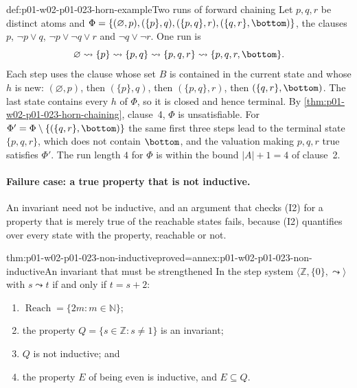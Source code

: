 \begin{hbexample}{def:p01-w02-p01-023-horn-example}{Two runs of forward chaining}
Let \(p,q,r\) be distinct atoms and
\(\Phi=\{(\varnothing,p),(\{p\},q),(\{p,q\},r),(\{q,r\},\bottom)\}\), the
clauses \(p\), \(\neg p\lor q\), \(\neg p\lor\neg q\lor r\) and
\(\neg q\lor\neg r\). One run is
\[
  \varnothing\leadsto\{p\}\leadsto\{p,q\}\leadsto\{p,q,r\}
  \leadsto\{p,q,r,\bottom\}.
\]
Each step uses the clause whose set \(B\) is contained in the current state
and whose \(h\) is new: \((\varnothing,p)\), then \((\{p\},q)\), then
\((\{p,q\},r)\), then \((\{q,r\},\bottom)\). The last state contains every
\(h\) of \(\Phi\), so it is closed and hence terminal. By
\cref{thm:p01-w02-p01-023-horn-chaining}, clause~4, \(\Phi\) is
unsatisfiable. For \(\Phi'=\Phi\setminus\{(\{q,r\},\bottom)\}\) the same
first three steps lead to the terminal state \(\{p,q,r\}\), which does not
contain \(\bottom\), and the valuation making \(p,q,r\) true satisfies
\(\Phi'\). The run length \(4\) for \(\Phi\) is within the bound
\(\lvert A\rvert+1=4\) of clause~2.
\end{hbexample}

\paragraph{Failure case: a true property that is not inductive.}
An invariant need not be inductive, and an argument that checks (I2) for a
property that is merely true of the reachable states fails, because (I2)
quantifies over every state with the property, reachable or not.

\begin{hbtheorem}{thm:p01-w02-p01-023-non-inductive}{proved=annex:p01-w02-p01-023-non-inductive}{An invariant that must be strengthened}
In the step system \(\langle\mathbb Z,\{0\},\leadsto\rangle\) with
\(s\leadsto t\) if and only if \(t=s+2\):
\begin{enumerate}
  \item \(\operatorname{Reach}=\{2m:m\in\mathbb N\}\);
  \item the property \(Q=\{s\in\mathbb Z:s\neq1\}\) is an invariant;
  \item \(Q\) is not inductive; and
  \item the property \(E\) of being even is inductive, and
        \(E\subseteq Q\).
\end{enumerate}
\end{hbtheorem}

